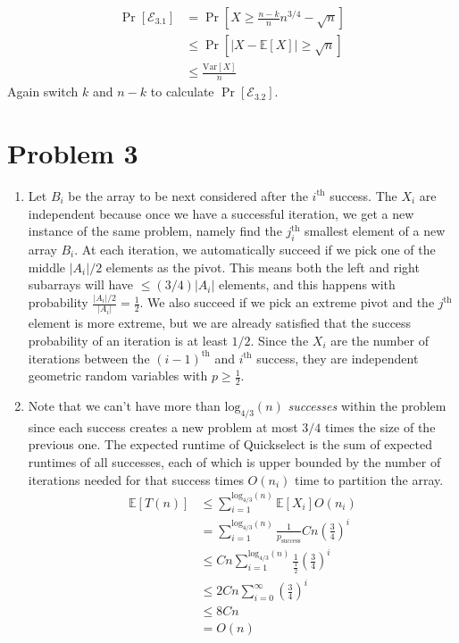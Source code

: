 \documentclass[11pt]{article}
\newcommand{\E}{\mathbb{E}}
\newcommand{\emf}{\mathcal{E}}
\newcommand{\Var}{\text{Var}}
\newcommand{\p}[1]{\left(#1\right)}
\newcommand{\logb}[2]{\text{log}_{#1}\p{#2}}
\begin{document}
\begin{enumerate}[(i)]
\begin{align*}
\Pr[\emf_{3.1}] &= \Pr[X \geq \frac {n-k}nn^{3/4}-\sqrt n]\\
&\leq \Pr[|X-\E[X]| \geq \sqrt n]\\
&\leq \frac{\Var[X]}n
\end{align*}
Again switch $k$ and $n-k$ to calculate $\Pr[\emf_{3.2}]$.
\end{enumerate}


\newpage
\section*{Problem 3}
\begin{enumerate}[1.]
\item Let $B_i$ be the array to be next considered after the $i^{\text{th}}$ success. The $X_i$ are independent because once we have a successful iteration, we get a new instance of the same problem, namely find the $j_i^{\text{th}}$ smallest element of a new array $B_i$. At each iteration, we automatically succeed if we pick one of the middle $|A_i|/2$ elements as the pivot. This means both the left and right subarrays will have $\leq (3/4)|A_i|$ elements, and this happens with probability $\frac{|A_i|/2}{|A_i|}=\frac12$. We also succeed if we pick an extreme pivot and the $j^{\text{th}}$ element is more extreme, but we are already satisfied that the success probability of an iteration is at least $1/2$. Since the $X_i$ are the number of iterations between the $(i-1)^{\text{th}}$ and $i^{\text{th}}$ success, they are independent geometric random variables with $p\geq\frac12$.
\item Note that we can't have more than $\logb{4/3}n$ \textit{successes} within the problem since each success creates a new problem at most $3/4$ times the size of the previous one. The expected runtime of Quickselect is the sum of expected runtimes of all successes, each of which is upper bounded by the number of iterations needed for that success times $O(n_i)$ time to partition the array. \begin{align*}
\E[T(n)] &\leq \sum_{i=1}^{\logb{4/3}n} \E[X_i]O(n_i)\\
&= \sum_{i=1}^{\logb{4/3}n} \frac1{p_{\text{success}}}Cn(\frac34)^i\\
&\leq Cn\sum_{i=1}^{\logb{4/3}n} \frac1{\frac12}(\frac34)^i\\
&\leq 2Cn\sum_{i=0}^{\infty} (\frac34)^i\\
&\leq 8Cn\\
&= O(n)
\end{align*}
\end{enumerate}
\end{document}
